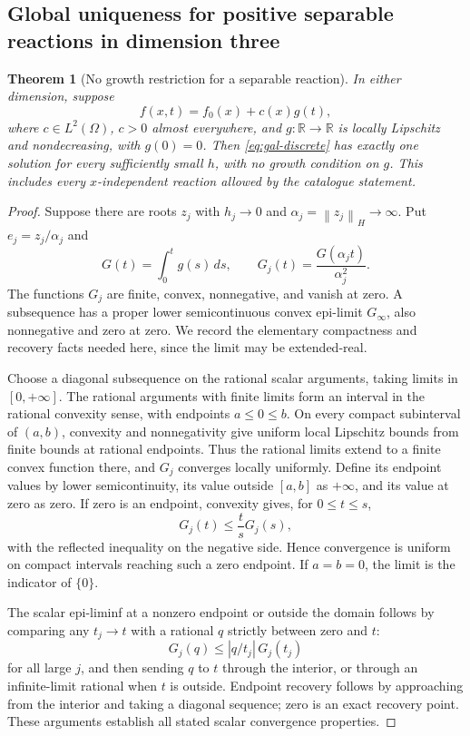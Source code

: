 \documentclass[11pt,a4paper]{article}
\newcommand{\R}{\mathbb R}
\newcommand{\norm}[1]{\left\lVert#1\right\rVert}
\newcommand{\abs}[1]{\left\lvert#1\right\rvert}
\newtheorem{theorem}{Theorem}[section]
\theoremstyle{definition}
\theoremstyle{remark}
\numberwithin{equation}{section}
\begin{document}
\subsection{Global uniqueness for positive separable reactions in dimension three}

\begin{theorem}[No growth restriction for a separable reaction]\label{thm:gal-separable}
In either dimension, suppose
\[
 f(x,t)=f_0(x)+c(x)g(t),
\]
where $c\in L^2(\Omega)$, $c>0$ almost everywhere, and $g:\R\to\R$ is locally Lipschitz and nondecreasing, with $g(0)=0$. Then \eqref{eq:gal-discrete} has exactly one solution for every sufficiently small $h$, with no growth condition on $g$. This includes every $x$-independent reaction allowed by the catalogue statement.
\end{theorem}
\begin{proof}
Suppose there are roots $z_j$ with $h_j\to0$ and $\alpha_j=\norm{z_j}_H\to\infty$. Put $e_j=z_j/\alpha_j$ and
\[
 G(t)=\int_0^t g(s)\,ds,\qquad G_j(t)=\frac{G(\alpha_jt)}{\alpha_j^2}.
\]
The functions $G_j$ are finite, convex, nonnegative, and vanish at zero. A subsequence has a proper lower semicontinuous convex epi-limit $G_\infty$, also nonnegative and zero at zero. We record the elementary compactness and recovery facts needed here, since the limit may be extended-real.

Choose a diagonal subsequence on the rational scalar arguments, taking limits in $[0,+\infty]$. The rational arguments with finite limits form an interval in the rational convexity sense, with endpoints $a\le0\le b$. On every compact subinterval of $(a,b)$, convexity and nonnegativity give uniform local Lipschitz bounds from finite bounds at rational endpoints. Thus the rational limits extend to a finite convex function there, and $G_j$ converges locally uniformly. Define its endpoint values by lower semicontinuity, its value outside $[a,b]$ as $+\infty$, and its value at zero as zero. If zero is an endpoint, convexity gives, for $0\le t\le s$,
\[
 G_j(t)\le\frac{t}{s}G_j(s),
\]
with the reflected inequality on the negative side. Hence convergence is uniform on compact intervals reaching such a zero endpoint. If $a=b=0$, the limit is the indicator of $\{0\}$.

The scalar epi-liminf at a nonzero endpoint or outside the domain follows by comparing any $t_j\to t$ with a rational $q$ strictly between zero and $t$:
\[
 G_j(q)\le\abs{q/t_j}\,G_j(t_j)
\]
for all large $j$, and then sending $q$ to $t$ through the interior, or through an infinite-limit rational when $t$ is outside. Endpoint recovery follows by approaching from the interior and taking a diagonal sequence; zero is an exact recovery point. These arguments establish all stated scalar convergence properties.


\end{proof}
\end{document}
